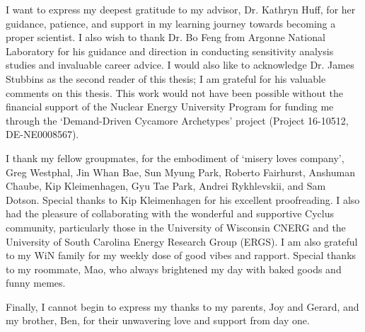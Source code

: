 I want to express my deepest gratitude to my advisor, 
Dr. Kathryn Huff, for her guidance, patience, and 
support in my learning journey towards becoming a proper scientist.
I also wish to thank Dr. Bo Feng from Argonne National 
Laboratory for his guidance and direction in conducting 
sensitivity analysis studies and invaluable career advice.  
I would also like to acknowledge Dr. James Stubbins as the 
second reader of this thesis; I am grateful for his valuable 
comments on this thesis. 
This work would not have been possible without the 
financial support of the Nuclear Energy University Program 
for funding me through the `Demand-Driven Cycamore Archetypes' 
project (Project 16-10512, DE-NE0008567).

I thank my fellow groupmates, for the embodiment of `misery 
loves company', Greg Westphal, Jin Whan Bae, Sun Myung Park, 
Roberto Fairhurst, Anshuman Chaube, Kip Kleimenhagen, 
Gyu Tae Park, Andrei Rykhlevskii, and Sam Dotson. 
Special thanks to Kip Kleimenhagen for his excellent proofreading. 
I also had the pleasure of collaborating with the wonderful 
and supportive Cyclus community, particularly those in the 
University of Wisconsin \gls{CNERG} and the University of 
South Carolina Energy Research Group (ERGS). 
I am also grateful to my WiN family for my weekly dose 
of good vibes and rapport. 
Special thanks to my roommate, Mao, who always brightened my 
day with baked goods and funny memes. 

Finally, I cannot begin to express my thanks to my parents, 
Joy and Gerard, and my brother, Ben, for their unwavering love 
and support from day one. 

